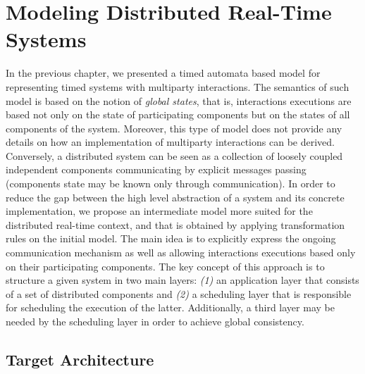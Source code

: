 \chapter{Modeling Distributed Real-Time Systems}\label{chap:3} 
\minitoc
In the previous chapter, we presented a timed automata based model for representing 
timed systems with multiparty interactions. The semantics of such model is based on 
the notion of \emph{global states}, that is, interactions executions are based not only on the 
state of participating components but on the states of all components of the system.
Moreover, this type of model does not provide any details on how an implementation of 
multiparty interactions can be derived.
Conversely, a distributed system can be seen as a collection of loosely coupled independent
components communicating by explicit messages passing (components state may be known only
through communication). 
In order to reduce the gap between the high level abstraction of a system and its concrete
implementation, we propose an intermediate model more suited for the distributed real-time
context, and that is obtained by applying transformation rules on the initial model. 
The main idea is to explicitly express the ongoing communication mechanism as well as 
allowing interactions executions based only on their participating components.
The key concept of this approach is to structure a given system in two main layers: \emph{(1)}
an application layer that consists of a set of distributed components and \emph{(2)} a 
scheduling layer that is responsible for scheduling the execution of the latter. Additionally, 
a third layer may be needed by the scheduling layer in order to achieve global consistency.
\section{Target Architecture}

